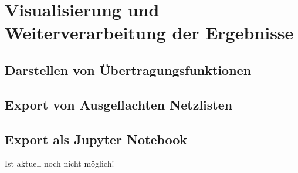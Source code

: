 \section{Visualisierung und Weiterverarbeitung der Ergebnisse}

\subsection{Darstellen von Übertragungsfunktionen}

\subsection{Export von Ausgeflachten Netzlisten}

\subsection{Export als Jupyter Notebook}
Ist aktuell noch nicht möglich!